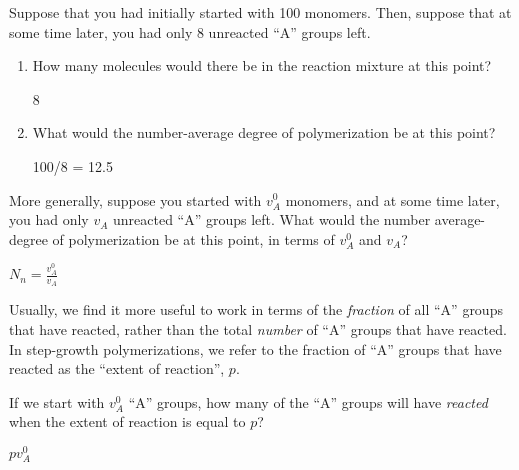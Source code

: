 \begin{activity}
\begin{ctqs}
		\question Suppose that you had initially started with 100 monomers.  Then, suppose that at some time later, you had only 8 unreacted ``A'' groups left.
		
			\begin{enumerate}
				\item How many molecules would there be in the reaction mixture at this point?
				
					\begin{solution}[0.5in]
						8
					\end{solution}
				
				\item What would the number-average degree of polymerization be at this point?
				
					\begin{solution}[0.5in]
						100/8 = 12.5
					\end{solution}
			\end{enumerate}
			
		\question More generally, suppose you started with $v_A^0$ monomers, and at some time later, you had only $v_A$ unreacted ``A'' groups left.  What would the number average-degree of polymerization be at this point, in terms of $v_A^0$ and $v_A$?
				
					\begin{solution}[0.5in]
						$N_n = \frac{v_A^0}{v_A}$
					\end{solution}
		
		\vspace{1in}
		
\end{ctqs}
	
\begin{infobox}

Usually, we find it more useful to work in terms of the \emph{fraction} of all ``A'' groups that have reacted, rather than the total \emph{number} of ``A'' groups that have reacted.  In step-growth polymerizations, we refer to the fraction of ``A'' groups that have reacted as the ``extent of reaction'', $p$.

\end{infobox}
	
\begin{ctqs}
		\question If we start with $v_A^0$ ``A'' groups, how many of the ``A'' groups will have \emph{reacted} when the extent of reaction is equal to $p$?
		
		\begin{solution}[1in]
			$p v_A^0$
		\end{solution}
		

\end{ctqs}
\end{activity}
